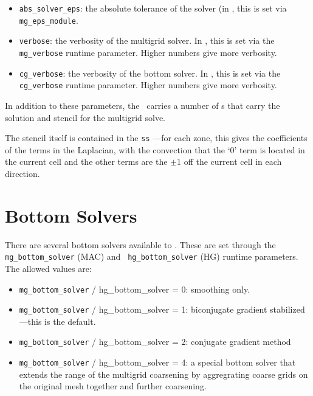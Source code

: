 \begin{itemize}
\item {\tt abs\_solver\_eps}: the absolute tolerance of the solver (in
  \maestro, this is set via {\tt mg\_eps\_module}.

\item {\tt verbose}: the verbosity of the multigrid solver.  In \maestro,
  this is set via the {\tt mg\_verbose} runtime parameter.  Higher
  numbers give more verbosity.

\item {\tt cg\_verbose}: the verbosity of the bottom solver.  In \maestro,
  this is set via the {\tt cg\_verbose} runtime parameter.  Higher
  numbers give more verbosity.

\end{itemize}

In addition to these parameters, the \mgtower\ carries a number of
\multifab s that carry the solution and stencil for the multigrid
solve.

The stencil itself is contained in the {\tt ss} \multifab---for each
zone, this gives the coefficients of the terms in the Laplacian, with
the convection that the `0' term is located in the current cell and
the other terms are the $\pm 1$ off the current cell in each direction.

\section{Bottom Solvers}

There are several bottom solvers available to \maestro.  These are set
through the {\tt mg\_bottom\_solver} (MAC) and {\tt
  hg\_bottom\_solver} (HG) runtime parameters.  The allowed values
  are:

\begin{itemize}

\item {\tt mg\_bottom\_solver} / {hg\_bottom\_solver} = 0: smoothing only.

\item {\tt mg\_bottom\_solver} / {hg\_bottom\_solver} = 1: biconjugate
  gradient stabilized---this is the default.

\item {\tt mg\_bottom\_solver} / {hg\_bottom\_solver} = 2: conjugate
  gradient method

\item {\tt mg\_bottom\_solver} / {hg\_bottom\_solver} = 4: a special 
  bottom solver that extends the range of the multigrid coarsening
  by aggregrating coarse grids on the original mesh together and
  further coarsening. 

\end{itemize}


